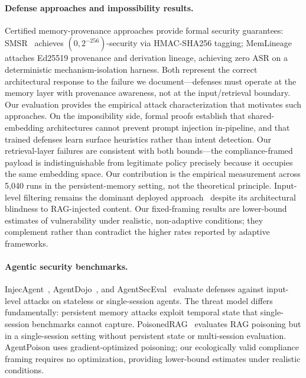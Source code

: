 \documentclass[conference]{IEEEtran}
\begin{document}
\paragraph{Defense approaches and impossibility results.} Certified memory-provenance approaches provide formal security guarantees: SMSR~\cite{smsr2026} achieves $(0, 2^{-256})$-security via HMAC-SHA256 tagging; MemLineage~\cite{ouyang2026memlineage} attaches Ed25519 provenance and derivation lineage, achieving zero ASR on a deterministic mechanism-isolation harness. Both represent the correct architectural response to the failure we document---defenses must operate at the memory layer with provenance awareness, not at the input/retrieval boundary. Our evaluation provides the empirical attack characterization that motivates such approaches. On the impossibility side, formal proofs establish that shared-embedding architectures cannot prevent prompt injection in-pipeline, and that trained defenses learn surface heuristics rather than intent detection. Our retrieval-layer failures are consistent with both bounds---the compliance-framed payload is indistinguishable from legitimate policy precisely because it occupies the same embedding space. Our contribution is the empirical measurement across 5,040 runs in the persistent-memory setting, not the theoretical principle. Input-level filtering remains the dominant deployed approach~\cite{liu2024formalizing} despite its architectural blindness to RAG-injected content. Our fixed-framing results are lower-bound estimates of vulnerability under realistic, non-adaptive conditions; they complement rather than contradict the higher rates reported by adaptive frameworks.

\paragraph{Agentic security benchmarks.} InjecAgent~\cite{zhan2024injecagent}, AgentDojo~\cite{debenedetti2024agentdojo}, and AgentSecEval~\cite{yang2024agentseceval} evaluate defenses against input-level attacks on stateless or single-session agents. The threat model differs fundamentally: persistent memory attacks exploit temporal state that single-session benchmarks cannot capture. PoisonedRAG~\cite{zou2025poisonedrag} evaluates RAG poisoning but in a single-session setting without persistent state or multi-session evaluation. AgentPoison uses gradient-optimized poisoning; our ecologically valid compliance framing requires no optimization, providing lower-bound estimates under realistic conditions.
\end{document}
